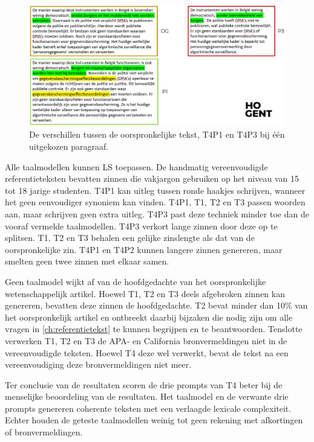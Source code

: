 \begin{figure}[H]
	\includegraphics[width=\linewidth]{img/vergelijking.png}
	\caption{De verschillen tussen de oorspronkelijke tekst, T4P1 en T4P3 bij één uitgekozen paragraaf.}
	\label{img:vergelijking-taalmodellen}
\end{figure}

\medspace

Alle taalmodellen kunnen LS toepassen. De handmatig vereenvoudigde referentieteksten bevatten zinnen die vakjargon gebruiken op het niveau van 15 tot 18 jarige studenten. T4P1 kan uitleg tussen ronde haakjes schrijven, wanneer het geen eenvoudiger synoniem kan vinden. T4P1, T1, T2 en T3 passen woorden aan, maar schrijven geen extra uitleg. T4P3 past deze techniek minder toe dan de vooraf vermelde taalmodellen. T4P3 verkort lange zinnen door deze op te splitsen. T1, T2 en T3 behalen een gelijke zinslengte als dat van de oorspronkelijke zin. T4P1 en T4P2 kunnen langere zinnen genereren, maar smelten geen twee zinnen met elkaar samen. 

\medspace

Geen taalmodel wijkt af van de hoofdgedachte van het oorspronkelijke wetenschappelijk artikel. Hoewel T1, T2 en T3 deels afgebroken zinnen kan genereren, bevatten deze zinnen de hoofdgedachte. T2 bevat minder dan 10\% van het oorspronkelijk artikel en ontbreekt daarbij bijzaken die nodig zijn om alle vragen in \ref{ch:referentietekst} te kunnen begrijpen en te beantwoorden. Tenslotte verwerken T1, T2 en T3 de APA- en California bronvermeldingen niet in de vereenvoudigde teksten. Hoewel T4 deze wel verwerkt, bevat de tekst na een vereenvoudiging deze bronvermeldingen niet meer.

\medspace

Ter conclusie van de resultaten scoren de drie prompts van T4 beter bij de menselijke beoordeling van de resultaten. Het taalmodel en de verwante drie prompts genereren coherente teksten met een verlaagde lexicale complexiteit. Echter houden de geteste taalmodellen weinig tot geen rekening met afkortingen of bronvermeldingen.

